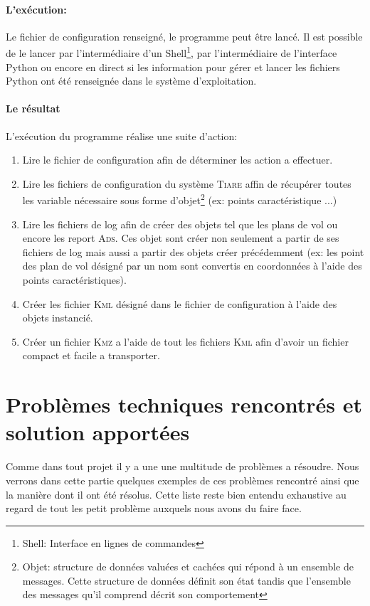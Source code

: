             \paragraph{L'exécution:}
Le fichier de configuration renseigné, le programme peut être lancé. Il est possible de le lancer par l'intermédiaire d'un Shell\footnote{Shell: Interface en lignes de commandes}, par l'intermédiaire de l'interface Python ou encore en direct si les information pour gérer et lancer les fichiers Python ont été renseignée dans le système d'exploitation.
            \paragraph{Le résultat}
L'exécution du programme réalise une suite d'action:
\begin{enumerate}
    \item Lire le fichier de configuration afin de déterminer les action a effectuer.
    \item Lire les fichiers de configuration du système \textsc{Tiare} affin de récupérer toutes les variable nécessaire sous forme d'objet\footnote{Objet: structure de données valuées et cachées qui répond à un ensemble de messages. Cette structure de données définit son état tandis que l'ensemble des messages qu'il comprend décrit son comportement} (ex: points caractéristique ...)
    \item Lire les fichiers de log afin de créer des objets tel que les plans de vol ou encore les report \textsc{Ads}. Ces objet sont créer non seulement a partir de ses fichiers de log mais aussi a partir des objets créer précédemment (ex: les point des plan de vol désigné par un nom sont convertis en coordonnées à l'aide des points caractéristiques).
    \item Créer les fichier \textsc{Kml} désigné dans le fichier de configuration à l'aide des objets instancié.
    \item Créer un fichier \textsc{Kmz} a l'aide de tout les fichiers \textsc{Kml} afin d'avoir un fichier compact et facile a transporter.
\end{enumerate}


\section{Problèmes techniques rencontrés et solution apportées}
Comme dans tout projet il y a une une multitude de problèmes a résoudre. Nous verrons dans cette partie quelques exemples de ces problèmes rencontré ainsi que la manière dont il ont été résolus. Cette liste reste bien entendu exhaustive au regard de tout les petit problème auxquels nous avons du faire face.

